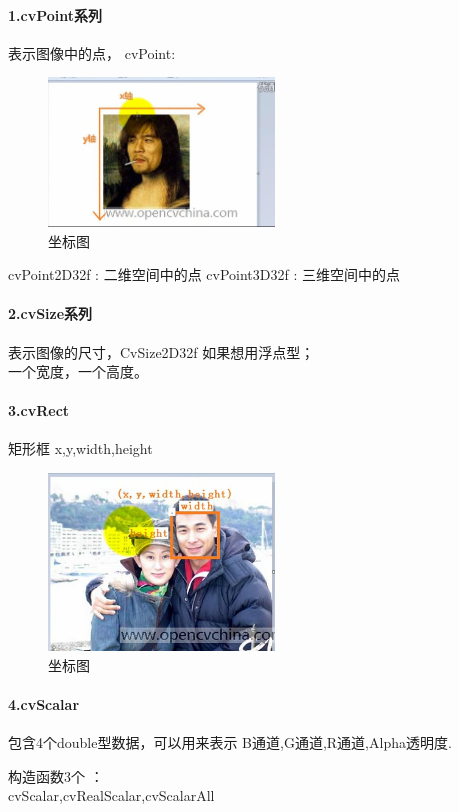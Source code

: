 \documentclass[UTF8,a4paper,8pt]{ctexart}
\begin{document}
    \paragraph{1.cvPoint系列}
    表示图像中的点， cvPoint:
    \begin{figure}[h] 	
    	\centering
    	\includegraphics[width=6cm,clip]{point_xy.png} 	
    	\caption{坐标图}	
    	\label{fig:myphoto} 
    \end{figure} 
    cvPoint2D32f : 二维空间中的点
    cvPoint3D32f : 三维空间中的点
	\paragraph{2.cvSize系列}
	表示图像的尺寸，CvSize2D32f 如果想用浮点型； \\
	一个宽度，一个高度。
    \paragraph{3.cvRect}
     矩形框  x,y,width,height
    
    \begin{figure}[h] 	
    	\centering
    	\includegraphics[width=6cm,clip]{cvRect.png} 	
    	\caption{坐标图}	
    	\label{fig:myphoto}
    \end{figure} 
    
    \paragraph{4.cvScalar}
    包含4个double型数据，可以用来表示 B通道,G通道,R通道,Alpha透明度.
    
    构造函数3个 ：\\
    cvScalar,cvRealScalar,cvScalarAll
    
\end{document}
